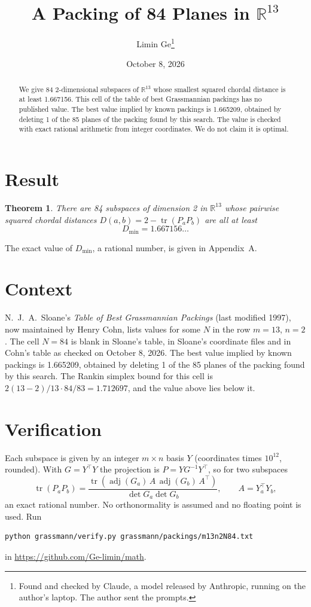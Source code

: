\documentclass[11pt,a4paper]{article}
\title{A Packing of 84 Planes in $\mathbb{R}^{13}$}
\author{Limin Ge\thanks{Found and checked by Claude, a model released by Anthropic, running on the author's laptop. The author sent the prompts.}}
\date{October 8, 2026}
\newtheorem*{theorem}{Theorem}
\begin{document}
\maketitle
\begin{abstract}
We give 84 2-dimensional subspaces of $\mathbb{R}^{13}$ whose smallest squared chordal distance is at least 1.667156. This cell of the table of best Grassmannian packings has no published value. The best value implied by known packings is 1.665209, obtained by deleting 1 of the 85 planes of the packing found by this search. The value is checked with exact rational arithmetic from integer coordinates. We do not claim it is optimal.
\end{abstract}

\section{Result}
\begin{theorem}
There are 84 subspaces of dimension 2 in $\mathbb{R}^{13}$ whose pairwise squared chordal distances $D(a,b) = 2 - \operatorname{tr}(P_aP_b)$ are all at least
\[ D_{\min} = 1.667156\ldots \]
\end{theorem}
The exact value of $D_{\min}$, a rational number, is given in Appendix~A.


\section{Context}
N.~J.~A.~Sloane's \emph{Table of Best Grassmannian Packings} (last modified 1997), now maintained by Henry Cohn, lists values for some $N$ in the row $m=13$, $n=2$. The cell $N=84$ is blank in Sloane's table, in Sloane's coordinate files and in Cohn's table as checked on October 8, 2026. The best value implied by known packings is 1.665209, obtained by deleting 1 of the 85 planes of the packing found by this search. The Rankin simplex bound for this cell is $2(13-2)/13\cdot 84/83 = 1.712697$, and the value above lies below it.


\section{Verification}
Each subspace is given by an integer $m\times n$ basis $Y$ (coordinates times $10^{12}$, rounded). With $G=Y^\top Y$ the projection is $P=YG^{-1}Y^\top$, so for two subspaces
\[ \operatorname{tr}(P_aP_b)=\frac{\operatorname{tr}(\operatorname{adj}(G_a)\,A\,\operatorname{adj}(G_b)\,A^\top)}{\det G_a\det G_b},\qquad A=Y_a^\top Y_b, \]
an exact rational number. No orthonormality is assumed and no floating point is used. Run
\begin{verbatim}
python grassmann/verify.py grassmann/packings/m13n2N84.txt
\end{verbatim}
in \url{https://github.com/Ge-limin/math}.
\end{document}
